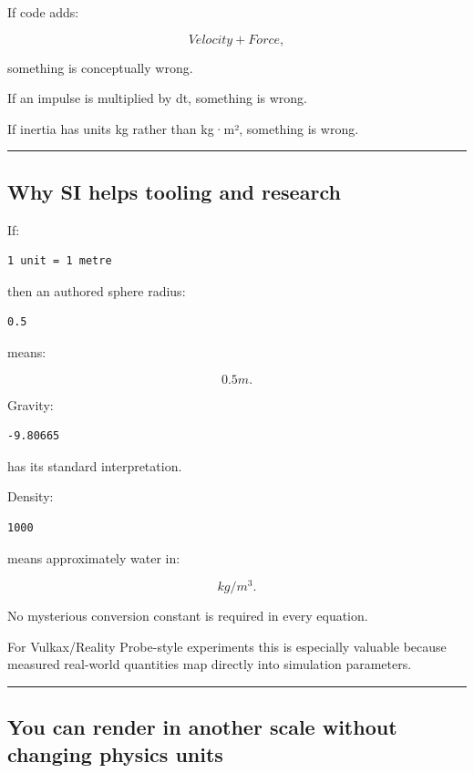 If code adds:

\[
Velocity+Force,
\]

something is conceptually wrong.

If an impulse is multiplied by dt, something is wrong.

If inertia has units kg rather than kg·m², something is wrong.

\begin{center}\rule{0.5\linewidth}{0.5pt}\end{center}

\subsection{Why SI helps tooling and research}\label{06-engine-ii-ch039-why-si-helps-tooling-and-research}

If:

\begin{verbatim}
1 unit = 1 metre
\end{verbatim}

then an authored sphere radius:

\begin{verbatim}
0.5
\end{verbatim}

means:

\[
0.5m.
\]

Gravity:

\begin{verbatim}
-9.80665
\end{verbatim}

has its standard interpretation.

Density:

\begin{verbatim}
1000
\end{verbatim}

means approximately water in:

\[
kg/m^3.
\]

No mysterious conversion constant is required in every equation.

For Vulkax/Reality Probe-style experiments this is especially valuable because measured real-world quantities map directly into simulation parameters.

\begin{center}\rule{0.5\linewidth}{0.5pt}\end{center}

\subsection{You can render in another scale without changing physics units}\label{06-engine-ii-ch039-you-can-render-in-another-scale-without-changing-physics-units}

